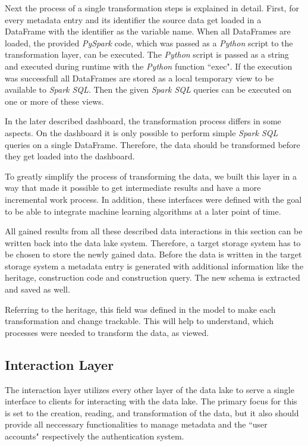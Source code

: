 \documentclass[conference]{IEEEtran}
\begin{document}
Next the process of a single transformation steps is explained in detail.
First, for every metadata entry and its identifier the source data get loaded in a DataFrame with 
the identifier as the variable name.
When all DataFrames are loaded, the provided \textit{PySpark} code, which was passed as a \textit{Python} 
script to the transformation layer, can be executed.
The \textit{Python} script is passed as a string and executed during runtime with the \textit{Python} function 
``exec".
If the execution was successfull all DataFrames are stored as a local temporary view to be available
to \textit{Spark SQL}. Then the given \textit{Spark SQL} queries can be executed on one or more of
these views.

In the later described dashboard, the transformation process differs in some aspects.
On the dashboard it is only possible to perform simple \textit{Spark SQL} queries on a single 
DataFrame. 
Therefore, the data should be transformed before they get loaded into the dashboard.

To greatly simplify the process of transforming the data, we built this layer in a way that made it 
possible to get intermediate results and have a more incremental work process.
In addition, these interfaces were defined with the goal to be able to integrate machine
learning algorithms at a later point of time. 

All gained results from all these described data interactions in this section can be written back 
into the data lake system.
Therefore, a target storage system has to be chosen to store the newly gained data. 
Before the data is written in the target storage system a metadata entry is generated with 
additional information like the heritage, construction code and construction query.
The new schema is extracted and saved as well. 

Referring to the heritage, this field was defined in the model to make each transformation and 
change trackable. 
This will help to understand, which processes were needed to transform the data, as viewed. 

\subsection{Interaction Layer}\label{IAL}
The interaction layer utilizes every other layer of the data lake to serve a single interface to 
clients for interacting with the data lake. 
The primary focus for this is set to the creation, reading, and transformation of the data, but it 
also should provide all neccessary functionalities to manage metadata and the ``user accounts"
respectively the authentication system.
\end{document}
